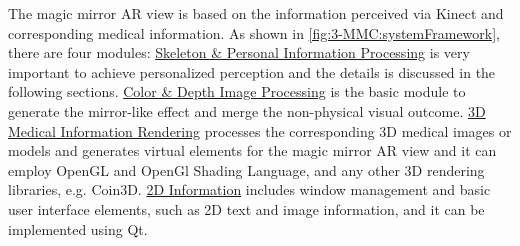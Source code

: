 The magic mirror AR view is based on the information perceived via Kinect and corresponding medical information. As shown in \figurename{\ref{fig:3-MMC:systemFramework}}, there are four modules:
\ul{Skeleton \& Personal Information Processing} is very important to achieve personalized perception and the details is discussed in the following sections. \ul{Color \& Depth Image Processing} is the basic module to generate the mirror-like effect and merge the non-physical visual outcome. \ul{3D Medical Information Rendering} processes the corresponding 3D medical images or models and generates virtual elements for the magic mirror AR view and it can employ OpenGL and OpenGl Shading Language, and any other 3D rendering libraries, e.g. Coin3D. \ul{2D Information} includes window management and basic user interface elements, such as 2D text and image information, and it can be implemented using Qt.

